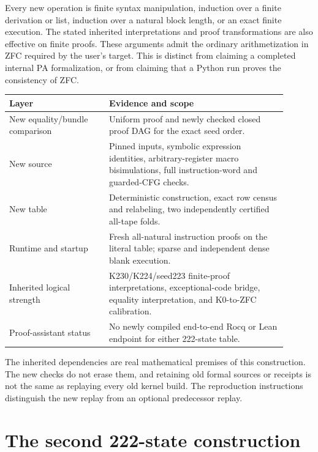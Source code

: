 Every new operation is finite syntax manipulation, induction over a
finite derivation or list, induction over a natural block length, or
an exact finite execution. The stated inherited interpretations and
proof transformations are also effective on finite proofs. These
arguments admit the ordinary arithmetization in ZFC required by the
user's target. This is distinct from claiming a completed internal PA
formalization, or from claiming that a Python run proves the consistency
of ZFC.

\begin{center}
\begin{tabular}{>{\raggedright\arraybackslash}p{0.32\linewidth}>{\raggedright\arraybackslash}p{0.58\linewidth}}
\toprule
Layer & Evidence and scope\\
\midrule
New equality/bundle comparison & Uniform proof and newly checked closed
proof DAG for the exact seed order.\\
New source & Pinned inputs, symbolic expression identities, arbitrary-register
macro bisimulations, full instruction-word and guarded-CFG checks.\\
New table & Deterministic construction, exact row census and relabeling,
two independently certified all-tape folds.\\
Runtime and startup & Fresh all-natural instruction proofs on the literal
table; sparse and independent dense blank execution.\\
Inherited logical strength & K230/K224/seed223 finite-proof interpretations,
exceptional-code bridge, equality interpretation, and K0-to-ZFC calibration.\\
Proof-assistant status & No newly compiled end-to-end Rocq or Lean endpoint
for either 222-state table.\\
\bottomrule
\end{tabular}
\end{center}

The inherited dependencies are real mathematical premises of this
construction. The new checks do not erase them, and retaining old
formal sources or receipts is not the same as replaying every old
kernel build. The reproduction instructions distinguish the new
replay from an optional predecessor replay.

\section{The second 222-state construction}
\label{sec:alternative}

